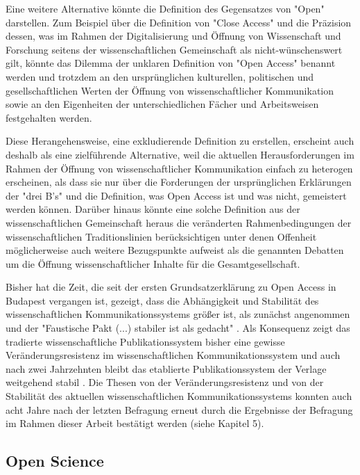Eine weitere Alternative könnte die Definition des Gegensatzes von "Open" darstellen. Zum Beispiel über die Definition von "Close Access" und die Präzision dessen, was im Rahmen der Digitalisierung und Öffnung von Wissenschaft und Forschung seitens der wissenschaftlichen Gemeinschaft als nicht-wünschenswert gilt, könnte das Dilemma der unklaren Definition von "Open Access" benannt werden und trotzdem an den ursprünglichen kulturellen, politischen und gesellschaftlichen Werten der Öffnung von wissenschaftlicher Kommunikation sowie an den Eigenheiten der unterschiedlichen Fächer und Arbeitsweisen festgehalten werden.

Diese Herangehensweise, eine exkludierende Definition zu erstellen, erscheint auch deshalb als eine zielführende Alternative, weil die aktuellen Herausforderungen im Rahmen der Öffnung von wissenschaftlicher Kommunikation einfach zu heterogen erscheinen, als dass sie nur über die Forderungen der ursprünglichen Erklärungen der "drei B's" und die Definition, was Open Access ist und was nicht, gemeistert werden können. Darüber hinaus könnte eine solche Definition aus der wissenschaftlichen Gemeinschaft heraus die veränderten Rahmenbedingungen der wissenschaftlichen Traditionslinien berücksichtigen unter denen Offenheit möglicherweise auch weitere Bezugspunkte aufweist als die genannten Debatten um die Öffnung wissenschaftlicher Inhalte für die Gesamtgesellschaft.

Bisher hat die Zeit, die seit der ersten Grundsatzerklärung zu Open Access in Budapest vergangen ist, gezeigt, dass die Abhängigkeit und Stabilität des wissenschaftlichen Kommunikationssystems größer ist, als zunächst angenommen und der "Faustische Pakt (...) stabiler ist als gedacht" \cite[:75]{Hagner_2015}. Als Konsequenz zeigt das tradierte wissenschaftliche Publikationssystem bisher eine gewisse Veränderungsresistenz im wissenschaftlichen Kommunikationssystem und auch nach zwei Jahrzehnten bleibt das etablierte Publikationssystem der Verlage weitgehend stabil \cite{Hanekop_2014}. Die Thesen von der Veränderungsresistenz und von der Stabilität des aktuellen wissenschaftlichen Kommunikationssystems konnten auch acht Jahre nach der letzten Befragung \cite{Hanekop_2007} erneut durch die Ergebnisse der Befragung im Rahmen dieser Arbeit bestätigt werden (siehe Kapitel 5).

\subsection{Open Science}

